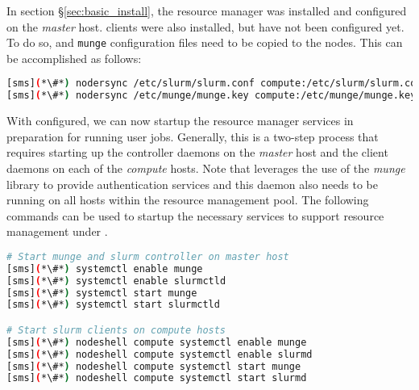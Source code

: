 In section \S\ref{sec:basic_install}, the \SLURM{} resource manager was
installed and configured on the  {\em master} host. \SLURM{} clients were also
installed, but have not been configured yet. To do so, \SLURM{} and
\texttt{munge} configuration files need to be copied to the nodes. This can be
accomplished as follows:

\begin{lstlisting}[language=bash,keywords={}]
[sms](*\#*) nodersync /etc/slurm/slurm.conf compute:/etc/slurm/slurm.conf
[sms](*\#*) nodersync /etc/munge/munge.key compute:/etc/munge/munge.key
\end{lstlisting}


With \SLURM{} configured, we can now startup the
resource manager services in preparation for running user jobs. Generally, this
is a two-step process that requires starting up the controller daemons on the {\em
 master} host and the client daemons on each of the {\em compute} hosts.
Note that \SLURM{} leverages the use of the {\em munge} library to provide
authentication services and this daemon also needs to be running on all hosts
within the resource management pool.
The following commands can be used to startup the necessary services to support
resource management under \SLURM{}.


\begin{lstlisting}[language=bash,keywords={}]
# Start munge and slurm controller on master host
[sms](*\#*) systemctl enable munge
[sms](*\#*) systemctl enable slurmctld
[sms](*\#*) systemctl start munge
[sms](*\#*) systemctl start slurmctld

# Start slurm clients on compute hosts
[sms](*\#*) nodeshell compute systemctl enable munge
[sms](*\#*) nodeshell compute systemctl enable slurmd
[sms](*\#*) nodeshell compute systemctl start munge
[sms](*\#*) nodeshell compute systemctl start slurmd
\end{lstlisting}


